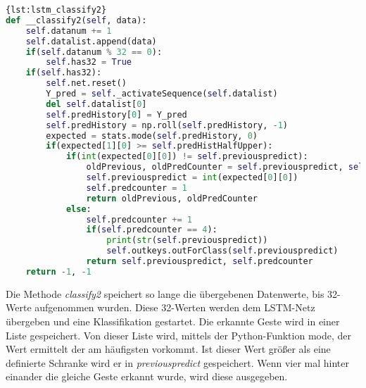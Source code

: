 \begin{lstlisting}[language=Python,caption={Classify
Variante 2},label={lst:lstm_classify2}]{lst:lstm_classify2}
def __classify2(self, data):
	self.datanum += 1
	self.datalist.append(data)
	if(self.datanum % 32 == 0):
		self.has32 = True
	if(self.has32):
		self.net.reset()
		Y_pred = self._activateSequence(self.datalist)
		del self.datalist[0]
		self.predHistory[0] = Y_pred
		self.predHistory = np.roll(self.predHistory, -1)
		expected = stats.mode(self.predHistory, 0)
		if(expected[1][0] >= self.predHistHalfUpper):
			if(int(expected[0][0]) != self.previouspredict):
				oldPrevious, oldPredCounter = self.previouspredict, self.previouspredict
				self.previouspredict = int(expected[0][0])
				self.predcounter = 1
				return oldPrevious, oldPredCounter
			else:
				self.predcounter += 1
				if(self.predcounter == 4):
					print(str(self.previouspredict))
					self.outkeys.outForClass(self.previouspredict)
				return self.previouspredict, self.predcounter
	return -1, -1
\end{lstlisting}

Die Methode \textit{classify2} speichert so lange die übergebenen Datenwerte, 
bis 32-Werte aufgenommen wurden. Diese 32-Werten werden dem \ac{LSTM}-Netz 
übergeben und eine Klassifikation gestartet. Die erkannte Geste wird in einer 
Liste gespeichert. Von dieser Liste wird, mittels der Python-Funktion mode, 
der Wert ermittelt der am häufigsten vorkommt. Ist dieser Wert größer als eine 
definierte Schranke wird er in \textit{previouspredict} gespeichert. Wenn vier 
mal hinter einander die gleiche Geste erkannt wurde, wird diese ausgegeben.

